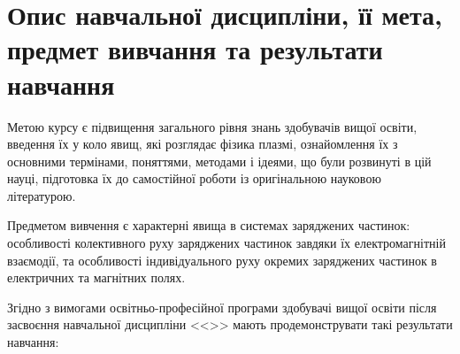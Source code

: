 \documentclass{Syllabus}
\begin{document}
\printhead


\bluetableprint


\section{Опис навчальної дисципліни, її мета, предмет вивчання та результати навчання}


Метою курсу є підвищення загального рівня знань здобувачів вищої освіти, введення їх у коло явищ, які розглядає фізика плазмі, ознайомлення їх з основними термінами, поняттями, методами і ідеями, що були розвинуті в цій науці, підготовка їх до самостійної роботи із оригінальною науковою літературою.

Предметом вивчення є характерні явища в системах заряджених частинок: особливості колективного руху заряджених частинок завдяки їх електромагнітній взаємодії, та особливості індивідуального руху окремих заряджених частинок в електричних та магнітних полях.


%

Згідно з вимогами освітньо-професійної програми здобувачі вищої освіти після засвоєння навчальної дисципліни <<\discipline>> мають продемонструвати такі результати навчання:
\end{document}

